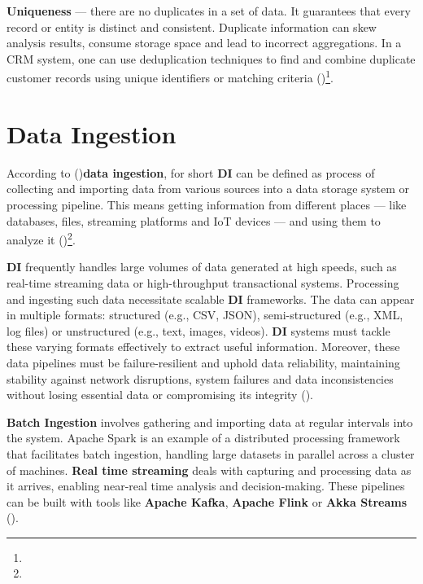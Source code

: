 \textbf{Uniqueness} —  there are no duplicates in a set of data. It guarantees that every record or entity is distinct and consistent. Duplicate information can skew analysis results, consume storage space and lead to incorrect aggregations. In a CRM system, one can use deduplication techniques to find and combine duplicate customer records using unique identifiers or matching criteria (\cite{andrewblackDimensionsDataQuality2020})\footnote[19]{}.

\section{Data Ingestion}

According to (\cite{Kona2023LeveragingSA})\footnotemark[16] \textbf{data ingestion}, for short \textbf{DI} can be defined as process of collecting and importing data from various sources into a data storage system or processing pipeline. This means getting information from different places — like databases, files, streaming platforms and IoT devices — and using them to analyze it (\cite{Kona2023LeveragingSA})\footnote[16]{}.

\textbf{DI} frequently handles large volumes of data generated at high speeds, such as real-time streaming data or high-throughput transactional systems. Processing and ingesting such data necessitate scalable \textbf{DI} frameworks. The data can appear in multiple formats: structured (e.g., CSV, JSON), semi-structured (e.g., XML, log files) or unstructured (e.g., text, images, videos). \textbf{DI} systems must tackle these varying formats effectively to extract useful information. Moreover, these data pipelines must be failure-resilient and uphold data reliability, maintaining stability against network disruptions, system failures and data inconsistencies without losing essential data or compromising its integrity (\cite{Kona2023LeveragingSA})\footnotemark[16].

\textbf{Batch Ingestion} involves gathering and importing data at regular intervals into the system. Apache Spark is an example of a distributed processing framework that facilitates batch ingestion, handling large datasets in parallel across a cluster of machines. \textbf{Real time streaming} deals with capturing and processing data as it arrives, enabling near-real time analysis and decision-making. These pipelines can be built with tools like \textbf{Apache Kafka}, \textbf{Apache Flink} or \textbf{Akka Streams} (\cite{Kona2023LeveragingSA})\footnotemark[16].

